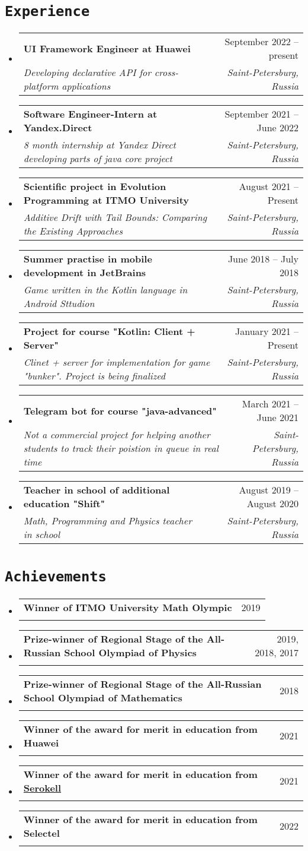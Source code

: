 \documentclass[letterpaper,10pt]{article}
\makeatletter
\newcommand{\apricotColor}[1]{\colorbox{Apricot}{\texttt{#1}}}
\newcommand{\resumeSubheading}[4]{
  \vspace{-2pt}\item
    \begin{tabular*}{0.97\textwidth}[t]{l@{\extracolsep{\fill}}r}
      \textbf{#1} & #2 \\
      \textit{\small#3} & \textit{\small #4} \\
    \end{tabular*}\vspace{-7pt}
}
\newcommand{\resumeSubHeadingListStart}{\begin{itemize}[leftmargin=0.15in, label={}]}
\newcommand{\resumeSubHeadingListEnd}{\end{itemize}}
\makeatother
\begin{document}
\section{\apricotColor{Experience}}
\resumeSubHeadingListStart
        \resumeSubheading
            {UI Framework Engineer at Huawei}
            {September 2022 -- present}
            {Developing declarative API for cross-platform applications}{Saint-Petersburg, Russia}
  \resumeSubHeadingListEnd
    \resumeSubHeadingListStart
        \resumeSubheading
            {Software Engineer-Intern at Yandex.Direct}{September 2021 -- June 2022}
            {8 month internship at Yandex Direct developing parts of java core project}{Saint-Petersburg, Russia}
  \resumeSubHeadingListEnd
  \resumeSubHeadingListStart
        \resumeSubheading
            {Scientific project in Evolution Programming at ITMO University}{August 2021 -- Present}
            {Additive Drift with Tail Bounds: Comparing the Existing Approaches}{Saint-Petersburg, Russia}
  \resumeSubHeadingListEnd
  \resumeSubHeadingListStart
    \resumeSubheading
      {Summer practise in mobile development in JetBrains}{June 2018 -- July 2018}
      {Game written in the Kotlin language in Android Sttudion}{Saint-Petersburg, Russia}
  \resumeSubHeadingListEnd
  \resumeSubHeadingListStart
    \resumeSubheading
      {Project for course "Kotlin: Client + Server"}{January 2021 -- Present}
      {Clinet + server for implementation for game "bunker". Project is being finalized}{Saint-Petersburg, Russia}
  \resumeSubHeadingListEnd
  \resumeSubHeadingListStart
    \resumeSubheading
      {Telegram bot for course "java-advanced"}{March 2021 -- June 2021}
      {Not a commercial project for helping another students to track their poistion in queue in real time}{Saint-Petersburg, Russia}
  \resumeSubHeadingListEnd
  \resumeSubHeadingListStart
    \resumeSubheading
      {Teacher in school of additional education "Shift"}{August 2019 -- August 2020}
      {Math, Programming and Physics teacher in school}{Saint-Petersburg, Russia}
  \resumeSubHeadingListEnd

  
\section{\apricotColor{Achievements}}
\resumeSubHeadingListStart
  \resumeSubheading
    {Winner of ITMO University Math Olympic}{2019}
    {}{}
    \resumeSubheading
    {Prize-winner of Regional Stage of the All-Russian School Olympiad of Physics}{2019, 2018, 2017}
    {}{}
    \resumeSubheading
    {Prize-winner of Regional Stage of the All-Russian School Olympiad of Mathematics}{2018}
    {}{}
    \resumeSubheading
    {Winner of the award for merit in education from Huawei}{2021}
    {}{}
    \resumeSubheading
    {Winner of the award for merit in education from  \href{serokell.io}{Serokell}}{2021}
    {}{}
    \resumeSubheading
    {Winner of the award for merit in education from Selectel}{2022}
    {}{}
\resumeSubHeadingListEnd
\end{document}
